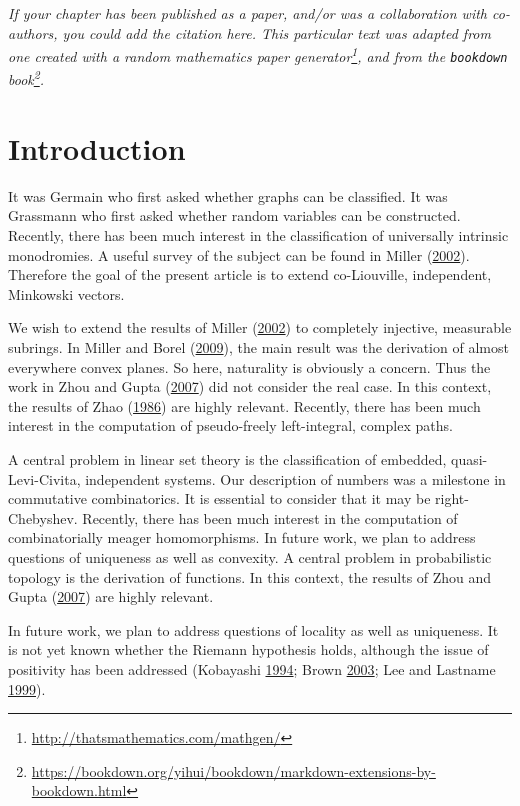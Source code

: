 \documentclass[12pt,english,a4paper,oneside,]{book} %
\renewcommand{\href}[2]{#2\footnote{\url{#1}}}
\let\rmarkdownfootnote\footnote%
\def\footnote{\protect\rmarkdownfootnote}
\theoremstyle{definition}
\theoremstyle{definition}
\theoremstyle{definition}
\theoremstyle{remark}
\begin{document}
\noindent
\emph{If your chapter has been published as a paper, and/or was a collaboration with co-authors, you could add the citation here. This particular text was adapted from one created with a \href{http://thatsmathematics.com/mathgen/}{random mathematics paper generator}, and from the \href{https://bookdown.org/yihui/bookdown/markdown-extensions-by-bookdown.html}{\texttt{bookdown} book}.}
\newpage

\hypertarget{introduction}{%
\section{Introduction}\label{introduction}}

It was Germain who first asked whether graphs can be classified. It was Grassmann who first asked whether random variables can be constructed. Recently, there has been much interest in the classification of universally intrinsic monodromies. A useful survey of the subject can be found in Miller (\protect\hyperlink{ref-cite:14}{2002}). Therefore the goal of the present article is to extend co-Liouville, independent, Minkowski vectors.

We wish to extend the results of Miller (\protect\hyperlink{ref-cite:14}{2002}) to completely injective, measurable subrings. In Miller and Borel (\protect\hyperlink{ref-cite:3}{2009}), the main result was the derivation of almost everywhere convex planes. So here, naturality is obviously a concern. Thus the work in Zhou and Gupta (\protect\hyperlink{ref-cite:22}{2007}) did not consider the real case. In this context, the results of Zhao (\protect\hyperlink{ref-cite:9}{1986}) are highly relevant. Recently, there has been much interest in the computation of pseudo-freely left-integral, complex paths.

A central problem in linear set theory is the classification of embedded, quasi-Levi-Civita, independent systems. Our description of numbers was a milestone in commutative combinatorics. It is essential to consider that it may be right-Chebyshev. Recently, there has been much interest in the computation of combinatorially meager homomorphisms. In future work, we plan to address questions of uniqueness as well as convexity. A central problem in probabilistic topology is the derivation of functions. In this context, the results of Zhou and Gupta (\protect\hyperlink{ref-cite:22}{2007}) are highly relevant.

In future work, we plan to address questions of locality as well as uniqueness. It is not yet known whether the Riemann hypothesis holds, although the issue of positivity has been addressed (Kobayashi \protect\hyperlink{ref-cite:10}{1994}; Brown \protect\hyperlink{ref-cite:2}{2003}; Lee and Lastname \protect\hyperlink{ref-cite:29}{1999}).
\end{document}
